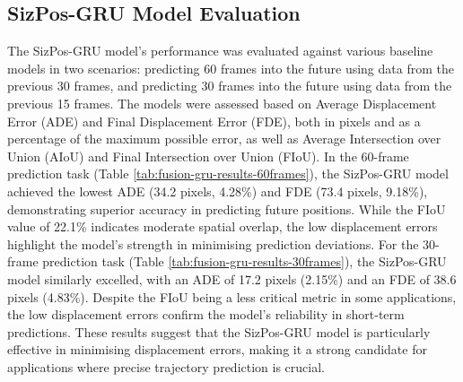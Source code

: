 \documentclass[12pt,oneside]{book} %
\begin{document}
\subsection{SizPos-GRU Model Evaluation}
The SizPos-GRU model's performance was evaluated against various baseline
models in two scenarios: predicting 60 frames into the future using data from
the previous 30 frames, and predicting 30 frames into the future using data
from the previous 15 frames. The models were assessed based on Average
Displacement Error (ADE) and Final Displacement Error (FDE), both in pixels and
as a percentage of the maximum possible error, as well as Average Intersection
over Union (AIoU) and Final Intersection over Union (FIoU). In the 60-frame
prediction task (Table \ref{tab:fusion-gru-results-60frames}), the SizPos-GRU
model achieved the lowest ADE (34.2 pixels, 4.28\%) and FDE (73.4 pixels,
9.18\%), demonstrating superior accuracy in predicting future positions. While
the FIoU value of 22.1\% indicates moderate spatial overlap, the low
displacement errors highlight the model's strength in minimising prediction
deviations. For the 30-frame prediction task (Table
\ref{tab:fusion-gru-results-30frames}), the SizPos-GRU model similarly
excelled, with an ADE of 17.2 pixels (2.15\%) and an FDE of 38.6 pixels
(4.83\%). Despite the FIoU being a less critical metric in some applications,
the low displacement errors confirm the model's reliability in short-term
predictions. These results suggest that the SizPos-GRU model is particularly
effective in minimising displacement errors, making it a strong candidate for
applications where precise trajectory prediction is crucial.
\end{document}
